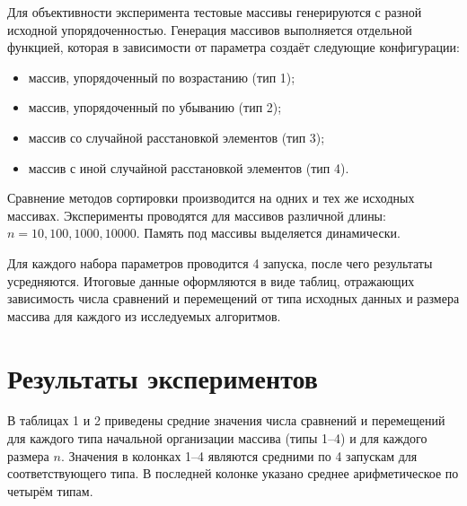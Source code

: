\documentclass[a4paper,12pt,titlepage,finall]{article}
\begin{document}
Для объективности эксперимента тестовые массивы генерируются с разной исходной упорядоченностью. Генерация массивов выполняется отдельной функцией, которая в зависимости от параметра создаёт следующие конфигурации:
\begin{itemize}
    \item массив, упорядоченный по возрастанию (тип 1);
    \item массив, упорядоченный по убыванию (тип 2);
    \item массив со случайной расстановкой элементов (тип 3);
    \item массив с иной случайной расстановкой элементов (тип 4).
\end{itemize}

Сравнение методов сортировки производится на одних и тех же исходных массивах. Эксперименты проводятся для массивов различной длины: \\
\( n = 10, 100, 1000, 10000 \). Память под массивы выделяется динамически.

Для каждого набора параметров проводится 4 запуска, после чего результаты усредняются. Итоговые данные оформляются в виде таблиц, отражающих зависимость числа сравнений и перемещений от типа исходных данных и размера массива для каждого из исследуемых алгоритмов.

\newpage

\section{Результаты экспериментов}

В таблицах 1 и 2 приведены средние значения числа сравнений и перемещений для каждого типа начальной организации массива (типы 1–4) и для каждого размера \(n\). Значения в колонках 1–4 являются средними по 4 запускам для соответствующего типа. В последней колонке указано среднее арифметическое по четырём типам.
\end{document}
